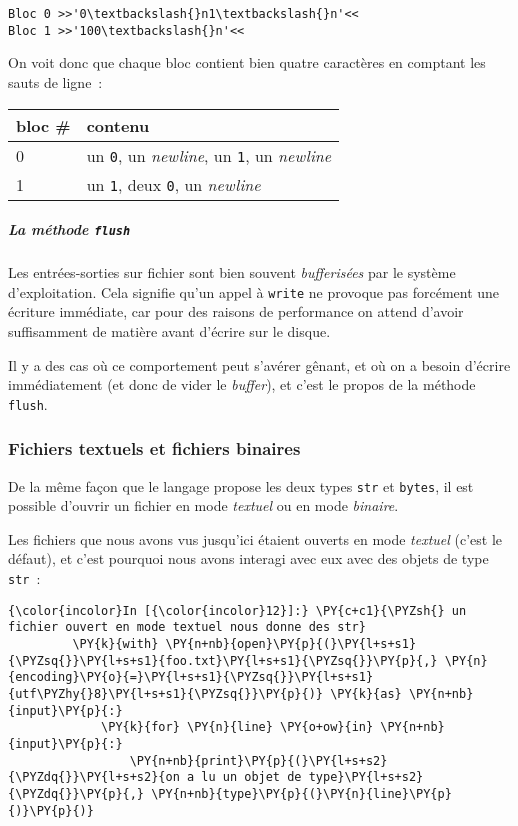     \begin{Verbatim}[commandchars=\\\{\}]
Bloc 0 >>'0\textbackslash{}n1\textbackslash{}n'<<
Bloc 1 >>'100\textbackslash{}n'<<

    \end{Verbatim}

    On voit donc que chaque bloc contient bien quatre caractères en comptant
les sauts de ligne~:

\begin{longtable}[]{@{}ll@{}}
\toprule
bloc \# & contenu\tabularnewline
\midrule
\endhead
0 & un \texttt{0}, un \emph{newline}, un \texttt{1}, un
\emph{newline}\tabularnewline
1 & un \texttt{1}, deux \texttt{0}, un \emph{newline}\tabularnewline
\bottomrule
\end{longtable}

    \hypertarget{la-muxe9thode-flush}{%
\subparagraph{\texorpdfstring{La méthode
\texttt{flush}}{La méthode flush}}\label{la-muxe9thode-flush}}

    Les entrées-sorties sur fichier sont bien souvent \emph{bufferisées} par
le système d'exploitation. Cela signifie qu'un appel à \texttt{write} ne
provoque pas forcément une écriture immédiate, car pour des raisons de
performance on attend d'avoir suffisamment de matière avant d'écrire sur
le disque.

Il y a des cas où ce comportement peut s'avérer gênant, et où on a
besoin d'écrire immédiatement (et donc de vider le \emph{buffer}), et
c'est le propos de la méthode \texttt{flush}.

    \hypertarget{fichiers-textuels-et-fichiers-binaires}{%
\subsubsection{Fichiers textuels et fichiers
binaires}\label{fichiers-textuels-et-fichiers-binaires}}

    De la même façon que le langage propose les deux types \texttt{str} et
\texttt{bytes}, il est possible d'ouvrir un fichier en mode
\emph{textuel} ou en mode \emph{binaire}.

    Les fichiers que nous avons vus jusqu'ici étaient ouverts en mode
\emph{textuel} (c'est le défaut), et c'est pourquoi nous avons interagi
avec eux avec des objets de type \texttt{str}~:

    \begin{Verbatim}[commandchars=\\\{\}]
{\color{incolor}In [{\color{incolor}12}]:} \PY{c+c1}{\PYZsh{} un fichier ouvert en mode textuel nous donne des str}
         \PY{k}{with} \PY{n+nb}{open}\PY{p}{(}\PY{l+s+s1}{\PYZsq{}}\PY{l+s+s1}{foo.txt}\PY{l+s+s1}{\PYZsq{}}\PY{p}{,} \PY{n}{encoding}\PY{o}{=}\PY{l+s+s1}{\PYZsq{}}\PY{l+s+s1}{utf\PYZhy{}8}\PY{l+s+s1}{\PYZsq{}}\PY{p}{)} \PY{k}{as} \PY{n+nb}{input}\PY{p}{:}
             \PY{k}{for} \PY{n}{line} \PY{o+ow}{in} \PY{n+nb}{input}\PY{p}{:}
                 \PY{n+nb}{print}\PY{p}{(}\PY{l+s+s2}{\PYZdq{}}\PY{l+s+s2}{on a lu un objet de type}\PY{l+s+s2}{\PYZdq{}}\PY{p}{,} \PY{n+nb}{type}\PY{p}{(}\PY{n}{line}\PY{p}{)}\PY{p}{)}
\end{Verbatim}


